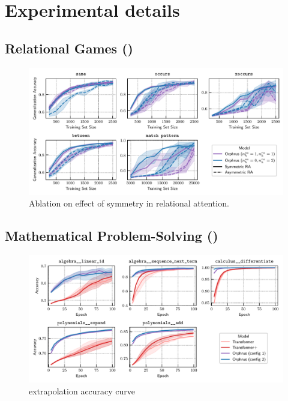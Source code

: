 \section{Experimental details}\label{sec:appendix_experimental_details}

\subsection{Relational Games ()}\label{ssec:appendxi_relgames}

\begin{figure}
    \centering
    \includegraphics[width=\textwidth]{figs/experiments/relgames/relgames_learning_curves_symmetry_ablation.pdf}
    \caption{Ablation on effect of symmetry in relational attention.}
\end{figure}

\subsection{Mathematical Problem-Solving ()}\label{ssec:appendix_math}

\begin{figure}
    \centering
    \includegraphics[width=\textwidth]{figs/experiments/math/math_training_curves_extrapolation.pdf}
    \caption{extrapolation accuracy curve}
\end{figure}

